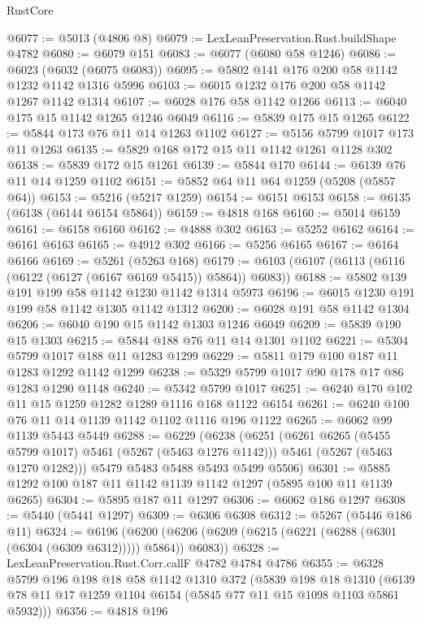 \begin{lexlean}{RustCore}
\begin{coremodule}
@6077 := @5013 (@4806 @8)
@6079 := LexLeanPreservation.Rust.buildShape @4782
@6080 := @6079 @151
@6083 := @6077 (@6080 @58 @1246)
@6086 := @6023 (@6032 (@6075 @6083))
@6095 := @5802 @141 @176 @200 @58 @1142 @1232 @1142 @1316 @5996
@6103 := @6015 @1232 @176 @200 @58 @1142 @1267 @1142 @1314
@6107 := @6028 @176 @58 @1142 @1266
@6113 := @6040 @175 @15 @1142 @1265 @1246 @6049
@6116 := @5839 @175 @15 @1265
@6122 := @5844 @173 @76 @11 @14 @1263 @1102
@6127 := @5156 @5799 @1017 @173 @11 @1263
@6135 := @5829 @168 @172 @15 @11 @1142 @1261 @1128 @302
@6138 := @5839 @172 @15 @1261
@6139 := @5844 @170
@6144 := @6139 @76 @11 @14 @1259 @1102
@6151 := @5852 @64 @11 @64 @1259 (@5208 (@5857 @64))
@6153 := @5216 (@5217 @1259)
@6154 := @6151 @6153
@6158 := @6135 (@6138 (@6144 @6154 @5864))
@6159 := @4818 @168
@6160 := @5014 @6159
@6161 := @6158 @6160
@6162 := @4888 @302
@6163 := @5252 @6162
@6164 := @6161 @6163
@6165 := @4912 @302
@6166 := @5256 @6165
@6167 := @6164 @6166
@6169 := @5261 (@5263 @168)
@6179 := @6103 (@6107 (@6113 (@6116 (@6122 (@6127 (@6167 @6169 @5415)) @5864)) @6083))
@6188 := @5802 @139 @191 @199 @58 @1142 @1230 @1142 @1314 @5973
@6196 := @6015 @1230 @191 @199 @58 @1142 @1305 @1142 @1312
@6200 := @6028 @191 @58 @1142 @1304
@6206 := @6040 @190 @15 @1142 @1303 @1246 @6049
@6209 := @5839 @190 @15 @1303
@6215 := @5844 @188 @76 @11 @14 @1301 @1102
@6221 := @5304 @5799 @1017 @188 @11 @1283 @1299
@6229 := @5811 @179 @100 @187 @11 @1283 @1292 @1142 @1299
@6238 := @5329 @5799 @1017 @90 @178 @17 @86 @1283 @1290 @1148
@6240 := @5342 @5799 @1017
@6251 := @6240 @170 @102 @11 @15 @1259 @1282 @1289 @1116 @168 @1122 @6154
@6261 := @6240 @100 @76 @11 @14 @1139 @1142 @1102 @1116 @196 @1122
@6265 := @6062 @99 @1139 @5443 @5449
@6288 := @6229
    (@6238
      (@6251
        (@6261 @6265 (@5455 @5799 @1017) @5461 (@5267 (@5463 @1276 @1142)))
        @5461
        (@5267 (@5463 @1270 @1282)))
      @5479
      @5483
      @5488
      @5493
      @5499
      @5506)
@6301 := @5885 @1292 @100 @187 @11 @1142 @1139 @1142 @1297 (@5895 @100 @11 @1139 @6265)
@6304 := @5895 @187 @11 @1297
@6306 := @6062 @186 @1297
@6308 := @5440 (@5441 @1297)
@6309 := @6306 @6308
@6312 := @5267 (@5446 @186 @11)
@6324 := @6196
    (@6200 (@6206 (@6209 (@6215 (@6221 (@6288 (@6301 (@6304 (@6309 @6312))))) @5864)) @6083))
@6328 := LexLeanPreservation.Rust.Corr.callF @4782 @4784 @4786
@6355 := @6328
    @5799
    @196
    @198
    @18
    @58
    @1142
    @1310
    @372
    (@5839
      @198
      @18
      @1310
      (@6139 @78 @11 @17 @1259 @1104 @6154 (@5845 @77 @11 @15 @1098 @1103 @5861 @5932)))
@6356 := @4818 @196

\end{coremodule}
\end{lexlean}
